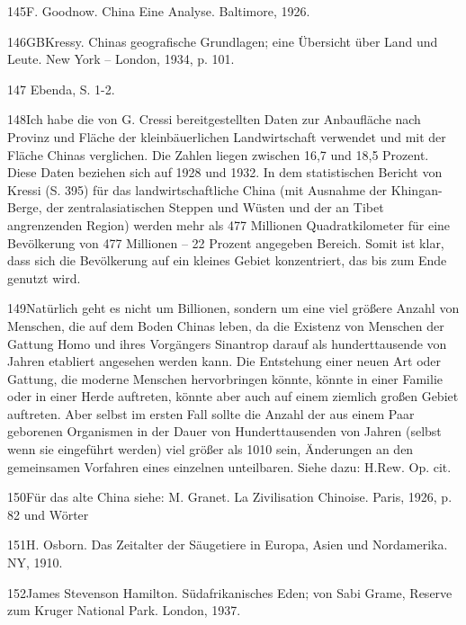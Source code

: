 \documentclass[11pt,a4paper]{book}
\begin{document}
145F. Goodnow. China Eine Analyse. Baltimore, 1926.



146GBKressy. Chinas geografische Grundlagen; eine Übersicht über Land und Leute. New York -- London, 1934, p. 101.



147 Ebenda, S. 1-2.



148Ich habe die von G. Cressi bereitgestellten Daten zur Anbaufläche nach Provinz und Fläche der kleinbäuerlichen Landwirtschaft verwendet und mit der Fläche Chinas verglichen. Die Zahlen liegen zwischen 16,7 und 18,5 Prozent. Diese Daten beziehen sich auf 1928 und 1932. In dem statistischen Bericht von Kressi (S. 395) für das landwirtschaftliche China (mit Ausnahme der Khingan-Berge, der zentralasiatischen Steppen und Wüsten und der an Tibet angrenzenden Region) werden mehr als 477 Millionen Quadratkilometer für eine Bevölkerung von 477 Millionen -- 22 Prozent angegeben Bereich. Somit ist klar, dass sich die Bevölkerung auf ein kleines Gebiet konzentriert, das bis zum Ende genutzt wird.



149Natürlich geht es nicht um Billionen, sondern um eine viel größere Anzahl von Menschen, die auf dem Boden Chinas leben, da die Existenz von Menschen der Gattung Homo und ihres Vorgängers Sinantrop darauf als hunderttausende von Jahren etabliert angesehen werden kann. Die Entstehung einer neuen Art oder Gattung, die moderne Menschen hervorbringen könnte, könnte in einer Familie oder in einer Herde auftreten, könnte aber auch auf einem ziemlich großen Gebiet auftreten. Aber selbst im ersten Fall sollte die Anzahl der aus einem Paar geborenen Organismen in der Dauer von Hunderttausenden von Jahren (selbst wenn sie eingeführt werden) viel größer als 1010 sein, Änderungen an den gemeinsamen Vorfahren eines einzelnen unteilbaren. Siehe dazu: H.Rew. Op. cit.



150Für das alte China siehe: M. Granet. La Zivilisation Chinoise. Paris, 1926, p. 82 und Wörter



151H. Osborn. Das Zeitalter der Säugetiere in Europa, Asien und Nordamerika. NY, 1910.



152James Stevenson Hamilton. Südafrikanisches Eden; von Sabi Grame, Reserve zum Kruger National Park. London, 1937.
\end{document}
